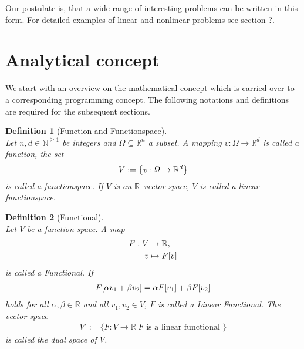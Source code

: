 \documentclass[a4paper,11pt]{article}
\numberwithin{equation}{section}
\newtheorem{definition}{Definition}[section]
\newcommand{\theoremNewline}{\hspace{1mm}\\}
\newcommand{\theoremEndLine}{\hspace{1mm}}
\newcommand{\komma}{\text{,}}
\newcommand{\N}{\mathbb{N}}
\newcommand{\R}{\mathbb{R}}
\begin{document}
    Our postulate is, that a wide range of interesting problems can be written in this form. For detailed examples of
    linear and nonlinear problems see section ?.

  \section{Analytical concept}

    We start with an overview on the mathematical concept which is carried over to a corresponding programming
    concept. The following notations and definitions are required for the subsequent sections.

    \begin{definition}[Function and Functionspace]\theoremNewline
      \label{definition::analytical_concept::function_functionspace}
      Let ${n,d \in \N^{\geq 1}}$ be integers and ${\Omega \subseteq \mathbb{R}^n}$ a subset. A mapping
      ${v : \Omega \rightarrow \R^d}$ is called a \textnormal{function}, the set
      \begin{align}
        V :=
          \big\{
            v : \Omega \rightarrow \R^d
          \big\}
          \notag
      \end{align}
      is called a \textnormal{functionspace}. If $V$ is an $\R$--vector space, $V$ is called a \textnormal{linear functionspace}.
    \end{definition}\theoremEndLine

    \begin{definition}[Functional]\theoremNewline
      \label{definition::analytical_concept::functional}
      Let $V$ be a function space. A map
      \begin{align}
        F: V &\rightarrow \R\komma
          \notag\\
        v &\mapsto F[v]
      \end{align}
      is called a \textnormal{Functional}. If
      \begin{align}
        F[\alpha v_1 + \beta v_2] = \alpha F[v_1] + \beta F[v_2]
          \notag
      \end{align}
      holds for all ${\alpha,\beta \in \R}$ and all ${v_1,v_2\in V}$, $F$ is called a \textnormal{Linear Functional}.
      The vector space
      \begin{align}
        V' := \big\{ F : V \rightarrow \R \big| F \text{ is a linear functional } \big\}
      \end{align}
      is called the dual space of $V$.
    \end{definition}\theoremEndLine
\end{document}
